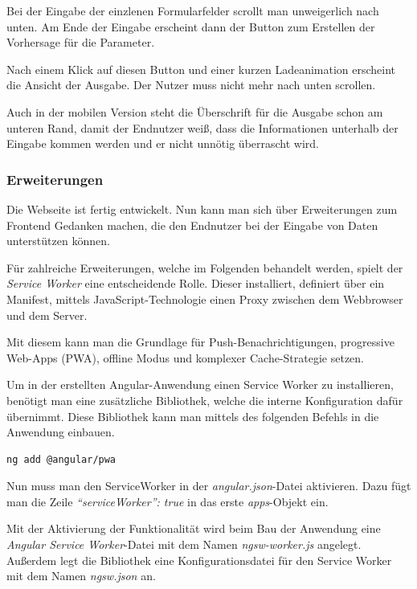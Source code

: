 Bei der Eingabe der einzlenen Formularfelder scrollt man unweigerlich nach unten. Am Ende der Eingabe erscheint dann der
Button zum Erstellen der Vorhersage für die Parameter.

Nach einem Klick auf diesen Button und einer kurzen Ladeanimation erscheint die Ansicht der Ausgabe. Der Nutzer muss
nicht mehr nach unten scrollen.

Auch in der mobilen Version steht die Überschrift für die Ausgabe schon am unteren Rand, damit der Endnutzer weiß, dass
die Informationen unterhalb der Eingabe kommen werden und er nicht unnötig überrascht wird.

\subsubsection{Erweiterungen}
Die Webseite ist fertig entwickelt. Nun kann man sich über Erweiterungen zum Frontend Gedanken machen, die den Endnutzer
bei der Eingabe von Daten unterstützen können.

Für zahlreiche Erweiterungen, welche im Folgenden behandelt werden, spielt der \textit{Service Worker} eine
entscheidende Rolle. Dieser installiert, definiert über ein Manifest, mittels JavaScript-Technologie einen Proxy
zwischen dem Webbrowser und dem Server.

Mit diesem kann man die Grundlage für Push-Benachrichtigungen, progressive Web-Apps (PWA), offline Modus und komplexer
Cache-Strategie setzen.

Um in der erstellten Angular-Anwendung einen Service Worker zu installieren, benötigt man eine zusätzliche Bibliothek,
welche die interne Konfiguration dafür übernimmt. Diese Bibliothek kann man mittels des folgenden Befehls in die
Anwendung einbauen.

\begin{lstlisting}[caption=Hinzufügen der PWA-Bibliothek, label=ls:umsetzung_angularaddpwa]
    ng add @angular/pwa
\end{lstlisting}

Nun muss man den ServiceWorker in der \textit{angular.json}-Datei aktivieren. Dazu fügt man die Zeile
\textit{\enquote{serviceWorker}: true} in das erste \textit{apps}-Objekt ein.

Mit der Aktivierung der Funktionalität wird beim Bau der Anwendung eine \textit{Angular Service Worker}-Datei mit dem
Namen \textit{ngsw-worker.js} angelegt. Außerdem legt die Bibliothek eine Konfigurationsdatei für den Service Worker mit
dem Namen \textit{ngsw.json} an.

